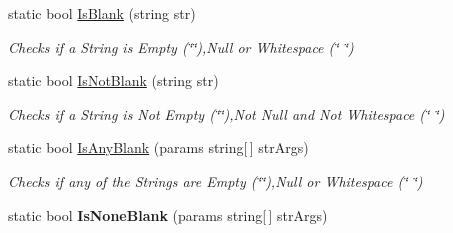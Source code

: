 \begin{DoxyCompactItemize}
static bool \hyperlink{class_ultimate_1_1_utilities_1_1_string_utils_a5907989f46851ebfda87b45e62a80938}{Is\+Blank} (string str)
\begin{DoxyCompactList}\small\item\em Checks if a String is Empty (\char`\"{}\char`\"{}),Null or Whitespace (\char`\"{} \char`\"{}) \end{DoxyCompactList}\item 
static bool \hyperlink{class_ultimate_1_1_utilities_1_1_string_utils_a8bdc1f9e95c94eaf931917946c258021}{Is\+Not\+Blank} (string str)
\begin{DoxyCompactList}\small\item\em Checks if a String is Not Empty (\char`\"{}\char`\"{}),Not Null and Not Whitespace (\char`\"{} \char`\"{}) \end{DoxyCompactList}\item 
static bool \hyperlink{class_ultimate_1_1_utilities_1_1_string_utils_a4be7e4afbf21aad56e5af0097b2ce524}{Is\+Any\+Blank} (params string\mbox{[}$\,$\mbox{]} str\+Args)
\begin{DoxyCompactList}\small\item\em Checks if any of the Strings are Empty (\char`\"{}\char`\"{}),Null or Whitespace (\char`\"{} \char`\"{}) \end{DoxyCompactList}\item 
static bool {\bfseries Is\+None\+Blank} (params string\mbox{[}$\,$\mbox{]} str\+Args)\hypertarget{class_ultimate_1_1_utilities_1_1_string_utils_a45ce9dead8f34b66ca72f1aa6755797e}{}\label{class_ultimate_1_1_utilities_1_1_string_utils_a45ce9dead8f34b66ca72f1aa6755797e}


\end{DoxyCompactItemize}
